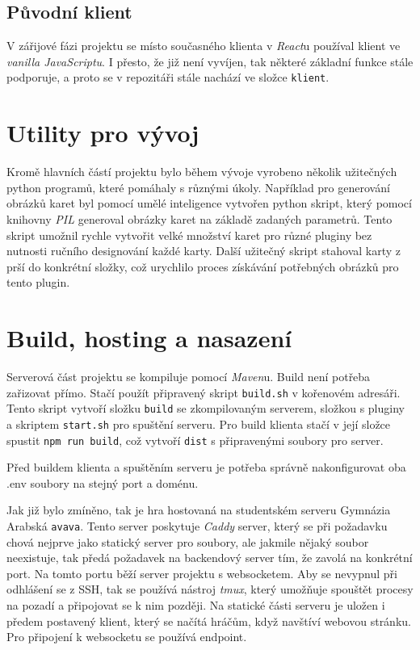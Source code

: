 \subsection{Původní klient}
V zářijové fázi projektu se místo současného klienta v \emph{React}u používal klient ve \emph{vanilla JavaScriptu}. I přesto, že již není vyvíjen, tak některé základní funkce stále podporuje, a proto se v repozitáři stále nachází ve složce \texttt{klient}.

\section{Utility pro vývoj}
Kromě hlavních částí projektu bylo během vývoje vyrobeno několik užitečných python programů, které pomáhaly s různými úkoly. Například pro generování obrázků karet byl pomocí umělé inteligence vytvořen python skript, který pomocí knihovny \emph{PIL} generoval obrázky karet na základě zadaných parametrů. Tento skript umožnil rychle vytvořit velké množství karet pro různé pluginy bez nutnosti ručního designování každé karty. Další užitečný skript stahoval karty z prší do konkrétní složky, což urychlilo proces získávání potřebných obrázků pro tento plugin.


\section{Build, hosting a nasazení}
Serverová část projektu se kompiluje pomocí \emph{Maven}u. Build není potřeba zařizovat přímo. Stačí použít připravený skript \texttt{build.sh} v kořenovém adresáři. Tento skript vytvoří složku \texttt{build} se zkompilovaným serverem, složkou s pluginy a skriptem \texttt{start.sh} pro spuštění serveru. Pro build klienta stačí v její složce spustit \texttt{npm run build}, což vytvoří \texttt{dist} s připravenými soubory pro server.

Před buildem klienta a spuštěním serveru je potřeba správně nakonfigurovat oba .env soubory na stejný port a doménu.

Jak již bylo zmíněno, tak je hra hostovaná na studentském serveru Gymnázia Arabská \texttt{avava}. Tento server poskytuje \emph{Caddy} server, který se při požadavku chová nejprve jako statický server pro soubory, ale jakmile nějaký soubor neexistuje, tak předá požadavek na backendový server tím, že zavolá na konkrétní port. Na tomto portu běží server projektu s websocketem. Aby se nevypnul při odhlášení se z SSH, tak se používá nástroj \emph{tmux}, který umožňuje spouštět procesy na pozadí a připojovat se k nim později. Na statické části serveru je uložen i předem postavený klient, který se načítá hráčům, když navštíví webovou stránku. Pro připojení k websocketu se používá  endpoint.

